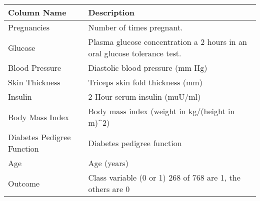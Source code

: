 \documentclass[12pt]{article}
\begin{document}
{%

\clearpage%
\thispagestyle{empty}%
\begin{landscape}%
\centering %
\begin{table}[]
\centering
\begin{tabular}{|l|l|}
\hline
Column Name                & Description                                                               \\ \hline
Pregnancies                & Number of times pregnant.                                                 \\ \hline
Glucose                    & Plasma glucose concentration a 2 hours in an oral glucose tolerance test. \\ \hline
Blood Pressure             & Diastolic blood pressure (mm Hg)                                          \\ \hline
Skin Thickness             & Triceps skin fold thickness (mm)                                          \\ \hline
Insulin                    & 2-Hour serum insulin (muU/ml)                                            \\ \hline
Body Mass Index            & Body mass index (weight in kg/(height in m)\textasciicircum{}2)           \\ \hline
Diabetes Pedigree Function & Diabetes pedigree function                                                \\ \hline
Age                        & Age (years)                                                               \\ \hline
Outcome                    & Class variable (0 or 1) 268 of 768 are 1, the others are 0                \\ \hline
\end{tabular}
\end{table}
\label{table:1}
\end{landscape}
\clearpage
}
\end{document}
